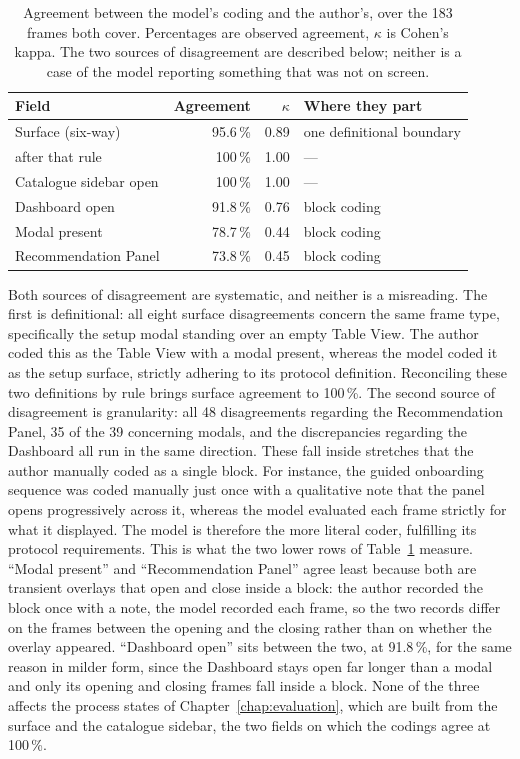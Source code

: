 \begin{table}[htpb]
    \centering
    \small
    \begin{tabular}{lrrl}
        \toprule
        Field & Agreement & $\kappa$ & Where they part \\
        \midrule
        Surface (six-way)      & 95.6\,\% & 0.89 & one definitional boundary \\
        \quad after that rule  & 100\,\%  & 1.00 & --- \\
        Catalogue sidebar open & 100\,\%  & 1.00 & --- \\
        Dashboard open         & 91.8\,\% & 0.76 & block coding \\
        Modal present          & 78.7\,\% & 0.44 & block coding \\
        Recommendation Panel   & 73.8\,\% & 0.45 & block coding \\
        \bottomrule
    \end{tabular}
    \caption{Agreement between the model's coding and the author's, over the 183 frames both cover. Percentages are observed agreement, $\kappa$ is Cohen's kappa. The two sources of disagreement are described below; neither is a case of the model reporting something that was not on screen.}
    \label{tab:agreement}
\end{table}

Both sources of disagreement are systematic, and neither is a misreading. The first is definitional: all eight surface disagreements concern the same frame type, specifically the setup modal standing over an empty Table View. The author coded this as the Table View with a modal present, whereas the model coded it as the setup surface, strictly adhering to its protocol definition. Reconciling these two definitions by rule brings surface agreement to 100\,\%. The second source of disagreement is granularity: all 48 disagreements regarding the Recommendation Panel, 35 of the 39 concerning modals, and the discrepancies regarding the Dashboard all run in the same direction. These fall inside stretches that the author manually coded as a single block. For instance, the guided onboarding sequence was coded manually just once with a qualitative note that the panel opens progressively across it, whereas the model evaluated each frame strictly for what it displayed. The model is therefore the more literal coder, fulfilling its protocol requirements. This is what the two lower rows of Table~\ref{tab:agreement} measure. \enquote{Modal present} and \enquote{Recommendation Panel} agree least because both are transient overlays that open and close inside a block: the author recorded the block once with a note, the model recorded each frame, so the two records differ on the frames between the opening and the closing rather than on whether the overlay appeared. \enquote{Dashboard open} sits between the two, at 91.8\,\%, for the same reason in milder form, since the Dashboard stays open far longer than a modal and only its opening and closing frames fall inside a block. None of the three affects the process states of Chapter~\ref{chap:evaluation}, which are built from the surface and the catalogue sidebar, the two fields on which the codings agree at 100\,\%.


